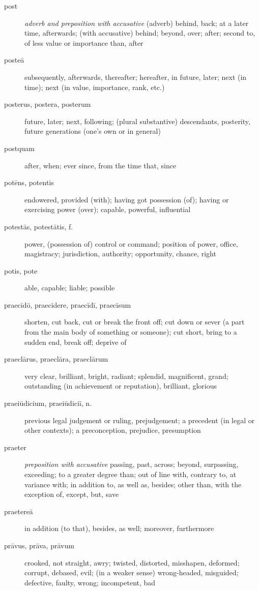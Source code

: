 \begin{description}
    \item[post] \textit{adverb and preposition with accusative} (adverb) behind, back; at a later time, afterwards; (with accusative) behind; beyond, over; after; second to, of less value or importance than, after 
    \item[posteā] subsequently, afterwards, thereafter; hereafter, in future, later; next (in time); next (in value, importance, rank, etc.)
    \item[posterus, postera, posterum] future, later; next, following; (plural substantive) descendants, posterity, future generations (one's own or in general)
    \item[postquam] after, when; ever since, from the time that, since
    \item[potēns, potentis] endowered, provided (with); having got possession (of); having or exercising power (over); capable, powerful, influential
    \item[potestās, potestātis, f.] power, (possession of) control or command; position of power, office, magistracy; jurisdiction, authority; opportunity, chance, right
    \item[potis, pote] able, capable; liable; possible
    \item[praecīdō, praecīdere, praecīdī, praecīsum] shorten, cut back, cut or break the front off; cut down or sever (a part from the main body of something or someone); cut short, bring to a sudden end, break off; deprive of
    \item[praeclārus, praeclāra, praeclārum] very clear, brilliant, bright, radiant; splendid, magnificent, grand; outstanding (in achievement or reputation), brilliant, glorious
    \item[praeiūdicium, praeiūdiciī, n.] previous  legal judgement or ruling, prejudgement; a precedent (in legal or other contexts); a preconception, prejudice, presumption
    \item[praeter] \textit{preposition with accusative} passing, past, across; beyond, surpassing, exceeding; to a greater degree than; out of line with, contrary to, at variance with; in addition to, as well as, besides; other than, with the exception of, except, but, save
    \item[praetereā] in addition (to that), besides, as well; moreover, furthermore
    \item[prāvus, prāva, prāvum] crooked, not straight, awry; twisted, distorted, misshapen, deformed; corrupt, debased, evil; (in a weaker sense) wrong-headed, misguided; defective, faulty, wrong; incompetent, bad

\end{description}
